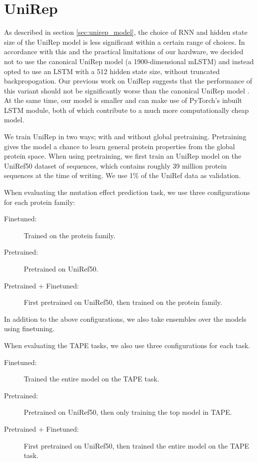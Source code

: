 \clearpage

\section{UniRep}
\label{sec:unirep_experiment}
As described in section \ref{sec:unirep_model}, the choice of RNN and hidden state size of the UniRep model is less significant within a certain range of choices. In accordance with this and the practical limitations of our hardware, we decided not to use the canonical UniRep model (a 1900-dimensional mLSTM) and instead opted to use an LSTM with a 512 hidden state size, without truncated backpropogation. Our previous work on UniRep suggests that the performance of this variant should not be significantly worse than the canonical UniRep model \cite{unirepproject}. At the same time, our model is smaller and can make use of PyTorch's inbuilt LSTM module, both of which contribute to a much more computationally cheap model.

We train UniRep in two ways; with and without global pretraining. Pretraining gives the model a chance to learn general protein properties from the global protein space. When using pretraining, we first train an UniRep model on the UniRef50 dataset of sequences, which contains roughly 39 million protein sequences at the time of writing. We use 1\% of the UniRef data as validation.

When evaluating the mutation effect prediction task, we use three configurations for each protein family:
\begin{description}
    \item[Finetuned:] Trained on the protein family.
    \item[Pretrained:] Pretrained on UniRef50.
    \item[Pretrained + Finetuned:] First pretrained on UniRef50, then trained on the protein family.
\end{description}
In addition to the above configurations, we also take ensembles over the models using finetuning.

When evaluating the TAPE tasks, we also use three configurations for each task.
\begin{description}
    \item[Finetuned:] Trained the entire model on the TAPE task.
    \item[Pretrained:] Pretrained on UniRef50, then only training the top model in TAPE.
    \item[Pretrained + Finetuned:] First pretrained on UniRef50, then trained the entire model on the TAPE task.
\end{description}

